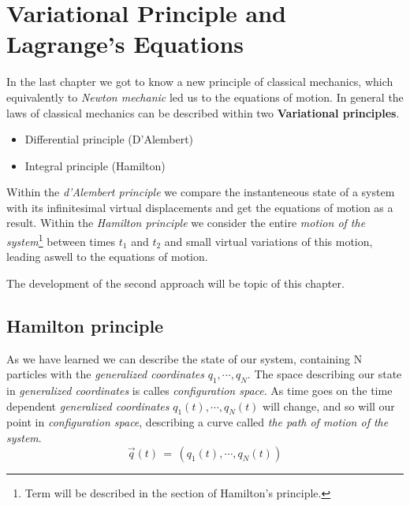 \chapter{Variational Principle and Lagrange's Equations}
In the last chapter we got to know a new principle of classical mechanics,
which equivalently to \textit{Newton mechanic} led us to the equations of
motion. In general the laws of classical mechanics can be described within two
\textbf{Variational principles}.
\begin{itemize}
  \item Differential principle (D'Alembert)
  \item Integral principle (Hamilton)
\end{itemize}
Within the \textit{d'Alembert principle} we compare the instanteneous state of
a system with its infinitesimal virtual displacements and get the equations of
motion as a result. Within the \textit{Hamilton principle} we consider the 
entire \textit{motion of the system}\footnote{Term will be described in the
section of Hamilton's principle.} between times $t_1$ and $t_2$ and small virtual 
variations of this motion, leading aswell to the equations of motion. 

The development of the second approach will be topic of this chapter.

\section{Hamilton principle}
As we have learned we can describe the state of our system, containing N
particles with the \textit{generalized coordinates} $q_1, \cdots, q_N$. The
space describing our state in \textit{generalized coordinates} is calles
\textit{configuration space}. As time goes on the time dependent
\textit{generalized coordinates} $q_1(t), \cdots, q_N(t)$ will change, and so
will our point in \textit{configuration space}, describing a curve called
\textit{the path of motion of the system}.
\begin{equation}
  \vec q(t) \,=\, (q_1(t), \cdots, q_N(t))
\end{equation}

